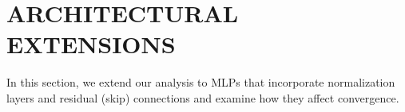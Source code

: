 \documentclass[twoside]{article}
\newcommand{\km}{\kappa_\phi}
\newcommand{\E}{\mathbb{E}\,}
\newcommand{\he}{\mathrm{he}}
\theoremstyle{definition}
\newcommand{\thomas}[1]{{\color{blue}\textit{#1}}}
\begin{document}

% 



 



\section{ARCHITECTURAL EXTENSIONS}

In this section, we extend our analysis to MLPs that incorporate normalization layers and residual (skip) connections and examine how they affect convergence.
\end{document}
